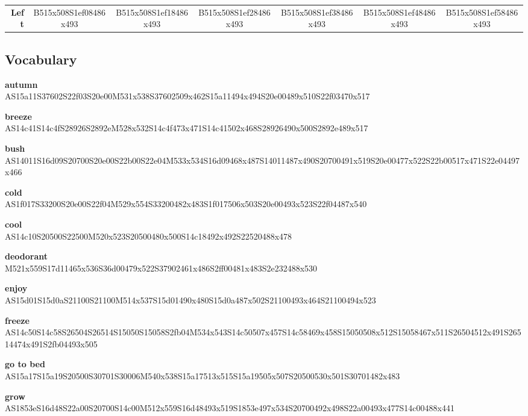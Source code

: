 \documentclass{article}
\begin{document}
\begin{center}
\begin{tabular}{r*{6}{c}}
\textbf{Left}&
B515x508S1ef08486x493&
B515x508S1ef18486x493&
B515x508S1ef28486x493&
B515x508S1ef38486x493&
B515x508S1ef48486x493&
B515x508S1ef58486x493\\
\end{tabular}
\end{center}

\subsection{Vocabulary}

\begin{glossary}

\textbf{autumn}\\
AS15a11S37602S22f03S20e00M531x538S37602509x462S15a11494x494S20e00489x510S22f03470x517

\textbf{breeze}\\
AS14c41S14c4fS28926S2892eM528x532S14c4f473x471S14c41502x468S28926490x500S2892e489x517

\textbf{bush}\\
AS14011S16d09S20700S20e00S22b00S22e04M533x534S16d09468x487S14011487x490S20700491x519S20e00477x522S22b00517x471S22e04497x466

\textbf{cold}\\
AS1f017S33200S20e00S22f04M529x554S33200482x483S1f017506x503S20e00493x523S22f04487x540

\textbf{cool}\\
AS14c10S20500S22500M520x523S20500480x500S14c18492x492S22520488x478

\textbf{deodorant}\\
M521x559S17d11465x536S36d00479x522S37902461x486S2ff00481x483S2e232488x530

\textbf{enjoy}\\
AS15d01S15d0aS21100S21100M514x537S15d01490x480S15d0a487x502S21100493x464S21100494x523

\textbf{freeze}\\
AS14c50S14c58S26504S26514S15050S15058S2fb04M534x543S14c50507x457S14c58469x458S15050508x512S15058467x511S26504512x491S26514474x491S2fb04493x505

\textbf{go to bed}\\
AS15a17S15a19S20500S30701S30006M540x538S15a17513x515S15a19505x507S20500530x501S30701482x483

\textbf{grow}\\
AS1853eS16d48S22a00S20700S14c00M512x559S16d48493x519S1853e497x534S20700492x498S22a00493x477S14c00488x441


\end{glossary}
\end{document}
